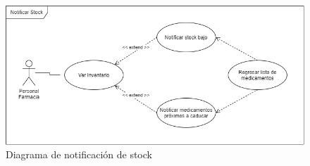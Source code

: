 \documentclass[12pt,letterpaper]{article}
\begin{document}
{\begin{figure}[!htb]
        \end{figure}
        \begin{figure}[!htb]
            \centering
            \includegraphics [scale=0.5]{notStock}
            \caption{Diagrama de notificación de stock}
        \end{figure}
			\vfill
	}
\end{document}
